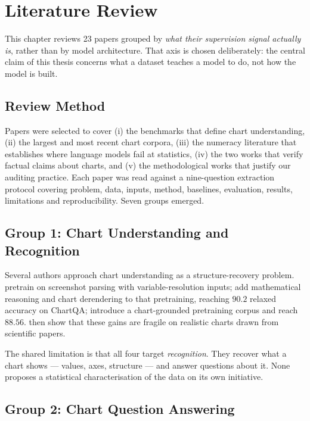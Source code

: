 \chapter{Literature Review}
\label{ch:lit}

This chapter reviews 23 papers grouped by \emph{what their supervision signal
actually is}, rather than by model architecture. That axis is chosen deliberately:
the central claim of this thesis concerns what a dataset teaches a model to do,
not how the model is built.

\section{Review Method}

Papers were selected to cover (i) the benchmarks that define chart understanding,
(ii) the largest and most recent chart corpora, (iii) the numeracy literature that
establishes where language models fail at statistics, (iv) the two works that
verify factual claims about charts, and (v) the methodological works that justify
our auditing practice. Each paper was read against a nine-question extraction
protocol covering problem, data, inputs, method, baselines, evaluation, results,
limitations and reproducibility. Seven groups emerged.

\section{Group 1: Chart Understanding and Recognition}

Several authors approach chart understanding as a structure-recovery problem.
\citet{pix2struct} pretrain on screenshot parsing with variable-resolution
inputs; \citet{matcha} add mathematical reasoning and chart derendering to that
pretraining, reaching $90.2$ relaxed accuracy on ChartQA; \citet{unichart}
introduce a chart-grounded pretraining corpus and reach $88.56$. \citet{charxiv}
then show that these gains are fragile on realistic charts drawn from scientific
papers.

The shared limitation is that all four target \emph{recognition}. They recover
what a chart shows --- values, axes, structure --- and answer questions about it.
None proposes a statistical characterisation of the data on its own initiative.

\section{Group 2: Chart Question Answering}

